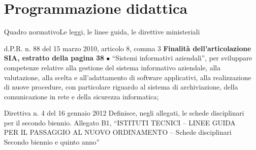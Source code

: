\documentclass[italian]{beamer}
\begin{document}
\section[Programmazione didattica]{Programmazione didattica}

\begin{frame}[allowframebreaks]{Quadro normativo}{Le leggi, le linee guida, le direttive ministeriali}

	\begin{block}{d.P.R. n. 88 del 15 marzo 2010, articolo 8, comma 3}
		\medbreak
		\noindent\textbf{Finalit\`a dell'articolazione SIA, estratto della pagina 38 }
		\medbreak
		$\bullet$ ``Sistemi informativi aziendali'', per sviluppare competenze relative alla gestione del
		sistema informativo aziendale, alla valutazione, alla scelta e all'adattamento di software applicativi,
		alla realizzazione di nuove procedure, con particolare riguardo al sistema di archiviazione, \alert{della
		comunicazione in rete} e della sicurezza informatica;
	\end{block}
	
	\begin{block}{Direttiva n. 4  del 16 gennaio 2012}
		\medbreak
		Definisce, negli allegati, le schede disciplinari per il secondo biennio.
		\medbreak
		Allegato B1, ``ISTITUTI TECNICI -- LINEE GUIDA PER IL PASSAGGIO AL NUOVO ORDINAMENTO -- Schede disciplinari Secondo biennio e quinto anno''
	\end{block}\label{dir:16012012}
\end{frame}
\end{document}
